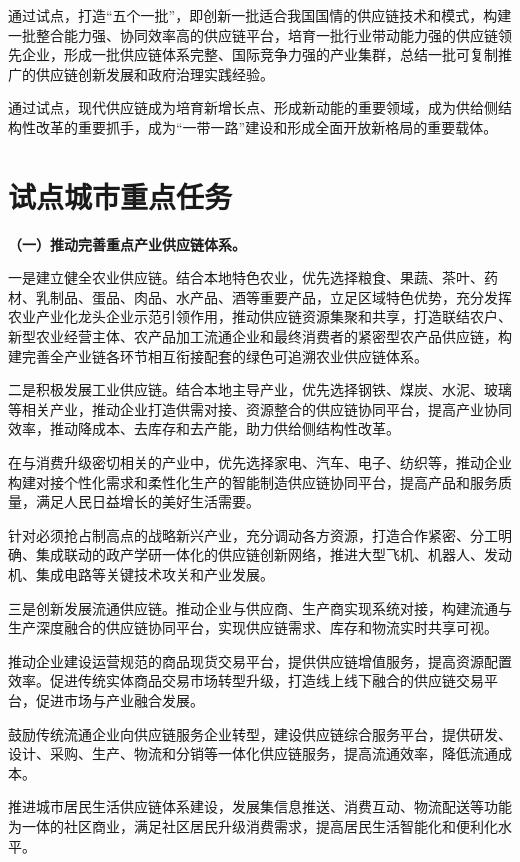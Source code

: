 通过试点，打造“五个一批”，即创新一批适合我国国情的供应链技术和模式，构建一批整合能力强、协同效率高的供应链平台，培育一批行业带动能力强的供应链领先企业，形成一批供应链体系完整、国际竞争力强的产业集群，总结一批可复制推广的供应链创新发展和政府治理实践经验。

通过试点，现代供应链成为培育新增长点、形成新动能的重要领域，成为供给侧结构性改革的重要抓手，成为“一带一路”建设和形成全面开放新格局的重要载体。

\section{试点城市重点任务}

{ \bf （一）推动完善重点产业供应链体系。 }

一是建立健全农业供应链。结合本地特色农业，优先选择粮食、果蔬、茶叶、药材、乳制品、蛋品、肉品、水产品、酒等重要产品，立足区域特色优势，充分发挥农业产业化龙头企业示范引领作用，推动供应链资源集聚和共享，打造联结农户、新型农业经营主体、农产品加工流通企业和最终消费者的紧密型农产品供应链，构建完善全产业链各环节相互衔接配套的绿色可追溯农业供应链体系。

二是积极发展工业供应链。结合本地主导产业，优先选择钢铁、煤炭、水泥、玻璃等相关产业，推动企业打造供需对接、资源整合的供应链协同平台，提高产业协同效率，推动降成本、去库存和去产能，助力供给侧结构性改革。

在与消费升级密切相关的产业中，优先选择家电、汽车、电子、纺织等，推动企业构建对接个性化需求和柔性化生产的智能制造供应链协同平台，提高产品和服务质量，满足人民日益增长的美好生活需要。

针对必须抢占制高点的战略新兴产业，充分调动各方资源，打造合作紧密、分工明确、集成联动的政产学研一体化的供应链创新网络，推进大型飞机、机器人、发动机、集成电路等关键技术攻关和产业发展。

三是创新发展流通供应链。推动企业与供应商、生产商实现系统对接，构建流通与生产深度融合的供应链协同平台，实现供应链需求、库存和物流实时共享可视。

推动企业建设运营规范的商品现货交易平台，提供供应链增值服务，提高资源配置效率。促进传统实体商品交易市场转型升级，打造线上线下融合的供应链交易平台，促进市场与产业融合发展。

鼓励传统流通企业向供应链服务企业转型，建设供应链综合服务平台，提供研发、设计、采购、生产、物流和分销等一体化供应链服务，提高流通效率，降低流通成本。

推进城市居民生活供应链体系建设，发展集信息推送、消费互动、物流配送等功能为一体的社区商业，满足社区居民升级消费需求，提高居民生活智能化和便利化水平。

